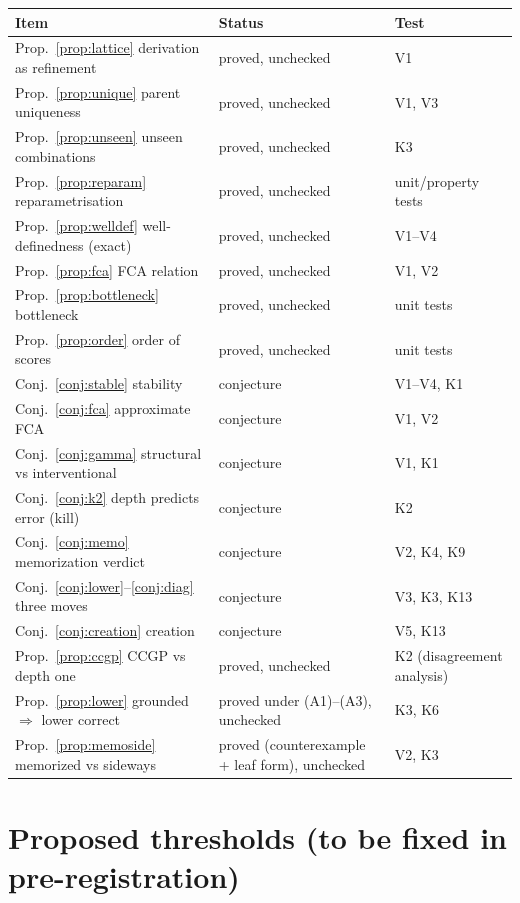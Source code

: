 \documentclass[11pt]{article}
\theoremstyle{definition}
\theoremstyle{plain}
\theoremstyle{remark}
\begin{document}
\begin{longtable}{p{}p{}p{}}
\toprule
Item & Status & Test \\
\midrule
\endhead
Prop.~\ref{prop:lattice} derivation as refinement & proved, unchecked & V1 \\
Prop.~\ref{prop:unique} parent uniqueness & proved, unchecked & V1, V3 \\
Prop.~\ref{prop:unseen} unseen combinations & proved, unchecked & K3 \\
Prop.~\ref{prop:reparam} reparametrisation & proved, unchecked & unit/property tests \\
Prop.~\ref{prop:welldef} well-definedness (exact) & proved, unchecked & V1--V4 \\
Prop.~\ref{prop:fca} FCA relation & proved, unchecked & V1, V2 \\
Prop.~\ref{prop:bottleneck} bottleneck & proved, unchecked & unit tests \\
Prop.~\ref{prop:order} order of scores & proved, unchecked & unit tests \\
Conj.~\ref{conj:stable} stability & conjecture & V1--V4, K1 \\
Conj.~\ref{conj:fca} approximate FCA & conjecture & V1, V2 \\
Conj.~\ref{conj:gamma} structural vs interventional & conjecture & V1, K1 \\
Conj.~\ref{conj:k2} depth predicts error (kill) & conjecture & K2 \\
Conj.~\ref{conj:memo} memorization verdict & conjecture & V2, K4, K9 \\
Conj.~\ref{conj:lower}--\ref{conj:diag} three moves & conjecture & V3, K3, K13 \\
Conj.~\ref{conj:creation} creation & conjecture & V5, K13 \\
Prop.~\ref{prop:ccgp} CCGP vs depth one & proved, unchecked & K2 (disagreement analysis) \\
Prop.~\ref{prop:lower} grounded $\Rightarrow$ lower correct & proved under (A1)--(A3), unchecked & K3, K6 \\
Prop.~\ref{prop:memoside} memorized vs sideways & proved (counterexample + leaf form), unchecked & V2, K3 \\
\bottomrule
\end{longtable}

\section*{Proposed thresholds (to be fixed in pre-registration)}
\end{document}
